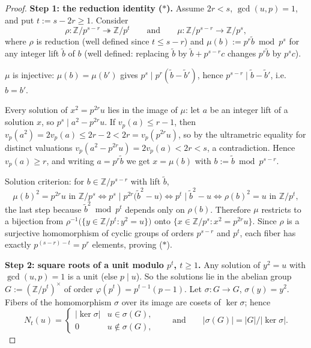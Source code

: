 \begin{proof}
  \textbf{Step 1: the reduction identity ($*$).}
  Assume $2r < s$, $\gcd(u,p) = 1$, and put $t := s - 2r \geq 1$. Consider
  \[
    \rho : \mathbb{Z}/p^{s-r} \twoheadrightarrow \mathbb{Z}/p^{t}
    \qquad\text{and}\qquad
    \mu : \mathbb{Z}/p^{s-r} \to \mathbb{Z}/p^{s},
  \]
  where $\rho$ is reduction (well defined since $t \leq s - r$) and
  $\mu(b) := p^{r}\tilde{b} \bmod p^{s}$ for any integer lift $\tilde{b}$ of $b$
  (well defined: replacing $\tilde{b}$ by $\tilde{b} + p^{s-r}c$ changes
  $p^{r}\tilde{b}$ by $p^{s}c$).

  $\mu$ is injective: $\mu(b) = \mu(b')$ gives
  $p^{s} \mid p^{r}(\tilde{b} - \tilde{b}')$, hence
  $p^{s-r} \mid \tilde{b} - \tilde{b}'$, i.e.\ $b = b'$.

  Every solution of $x^2 = p^{2r}u$ lies in the image of $\mu$: let $a$ be an
  integer lift of a solution $x$, so $p^{s} \mid a^2 - p^{2r}u$. If
  $v_p(a) \leq r - 1$, then $v_p(a^2) = 2v_p(a) \leq 2r - 2 < 2r = v_p(p^{2r}u)$,
  so by the ultrametric equality for distinct valuations
  $v_p(a^2 - p^{2r}u) = 2v_p(a) < 2r < s$, a contradiction. Hence
  $v_p(a) \geq r$, and writing $a = p^{r}\tilde{b}$ we get $x = \mu(b)$ with
  $b := \tilde{b} \bmod p^{s-r}$.

  Solution criterion: for $b \in \mathbb{Z}/p^{s-r}$ with lift $\tilde{b}$,
  \[
    \mu(b)^2 = p^{2r}u \text{ in } \mathbb{Z}/p^{s}
    \iff p^{s} \mid p^{2r}\bigl(\tilde{b}^2 - u\bigr)
    \iff p^{t} \mid \tilde{b}^2 - u
    \iff \rho(b)^2 = u \text{ in } \mathbb{Z}/p^{t},
  \]
  the last step because $\tilde{b}^2 \bmod p^{t}$ depends only on $\rho(b)$.
  Therefore $\mu$ restricts to a bijection from
  $\rho^{-1}\bigl(\{y \in \mathbb{Z}/p^{t} : y^2 = u\}\bigr)$ onto
  $\{x \in \mathbb{Z}/p^{s} : x^2 = p^{2r}u\}$. Since $\rho$ is a surjective
  homomorphism of cyclic groups of orders $p^{s-r}$ and $p^{t}$, each fiber has
  exactly $p^{(s-r)-t} = p^{r}$ elements, proving ($*$).

  \textbf{Step 2: square roots of a unit modulo $p^{t}$, $t \geq 1$.}
  Any solution of $y^2 = u$ with $\gcd(u,p) = 1$ is a unit (else $p \mid u$).
  So the solutions lie in the abelian group $G := (\mathbb{Z}/p^{t})^\times$ of
  order $\varphi(p^{t}) = p^{t-1}(p-1)$. Let $\sigma : G \to G$,
  $\sigma(y) = y^2$. Fibers of the homomorphism $\sigma$ over its image are
  cosets of $\ker\sigma$; hence
  \[
    N_t(u) =
    \begin{cases} |\ker\sigma| & u \in \sigma(G),\\ 0 & u \notin \sigma(G),\end{cases}
    \qquad\text{and}\qquad
    |\sigma(G)| = |G|/|\ker\sigma|. \tag{2.1}
  \]


\end{proof}
